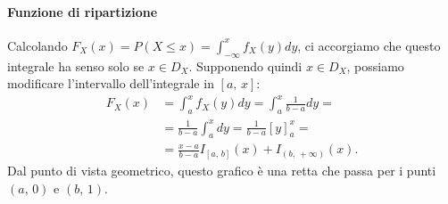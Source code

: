 \paragraph{Funzione di ripartizione}
Calcolando $F_X(x) = P(X \leq x) = \int_{-\infty}^x f_X(y) dy$, ci accorgiamo che questo integrale ha senso solo se $x \in D_X$. Supponendo quindi $x \in D_X$, possiamo modificare l'intervallo dell'integrale in $[a, \, x]$:
\begin{align*}
    F_X(x) &= \int_a^x f_X(y) dy = \int_a^x \frac{1}{b-a} dy = \\
    &= \frac{1}{b-a} \int_a^x dy = \frac{1}{b-a} [y]^x_a = \\ 
    &= \frac{x-a}{b-a} I_{[a,\,b]}(x) + I_{(b, \,+\infty)}(x).
\end{align*}
Dal punto di vista geometrico, questo grafico è una retta che passa per i punti $(a,\,0)$ e $(b,\,1)$. \\

